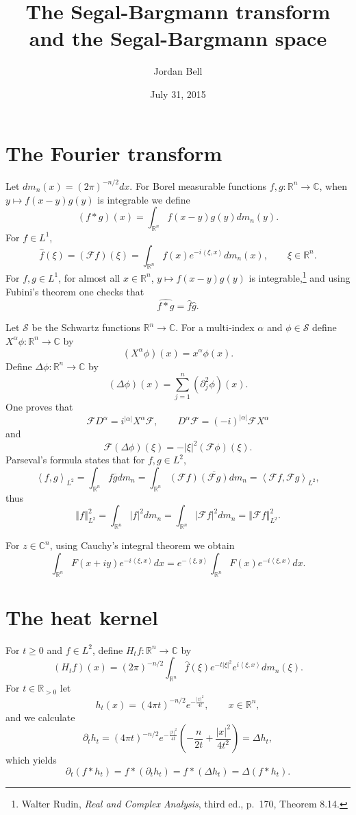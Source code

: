 \documentclass{article}
\newcommand{\inner}[2]{\left\langle #1, #2 \right\rangle}
\newcommand{\norm}[1]{\left\Vert #1 \right\Vert}
\theoremstyle{definition}
\begin{document}
\title{The Segal-Bargmann transform and the Segal-Bargmann space}
\author{Jordan Bell}
\date{July 31, 2015}

\maketitle

\section{The Fourier transform}
Let $dm_n(x) = (2\pi)^{-n/2} dx$. 
For Borel measurable functions $f,g:\mathbb{R}^n \to \mathbb{C}$, when $y \mapsto f(x-y) g(y)$ is integrable we define
\[
(f*g)(x) = \int_{\mathbb{R}^n} f(x-y) g(y) dm_n(y).
\]
For $f \in L^1$,
\[
\hat{f}(\xi) = (\mathscr{F}f)(\xi) = \int_{\mathbb{R}^n} f(x) e^{-i\inner{\xi}{x}} dm_n(x),
\qquad \xi \in \mathbb{R}^n.
\]
For $f,g \in L^1$, for almost all $x \in \mathbb{R}^n$, $y \mapsto f(x-y) g(y)$ is integrable,\footnote{Walter Rudin,
{\em Real and Complex Analysis}, third ed., p.~170, Theorem 8.14.}
and using Fubini's theorem one checks that
\[
\widehat{f*g}=\widehat{f} \widehat{g}.
\]

Let $\mathscr{S}$ be the Schwartz functions 
$\mathbb{R}^n \to \mathbb{C}$. 
For a multi-index $\alpha$ and $\phi \in \mathscr{S}$
define $X^\alpha \phi:\mathbb{R}^n \to \mathbb{C}$ by
\[
(X^\alpha \phi)(x) = x^\alpha \phi(x).
\]
Define $\Delta \phi:\mathbb{R}^n \to \mathbb{C}$ by
\[
(\Delta \phi)(x) = \sum_{j=1}^n (\partial_j^2 \phi)(x).
\]
One proves that 
\[
\mathscr{F} D^\alpha = i^{|\alpha|} X^\alpha \mathscr{F},
\qquad D^\alpha \mathscr{F} = (-i)^{|\alpha|} \mathscr{F} X^\alpha
\]
and
\[
\mathscr{F}(\Delta \phi)(\xi) = -|\xi|^2 (\mathscr{F}\phi)(\xi).
\]
Parseval's formula states that for $f,g \in L^2$,
\[
\inner{f}{g}_{L^2}=\int_{\mathbb{R}^n} f \overline{g} dm_n = \int_{\mathbb{R}^n} (\mathscr{F} f)\overline{(\mathscr{F}g)} dm_n=
\inner{\mathscr{F}f}{\mathscr{F}g}_{L^2},
\]
thus
\[
\norm{f}_{L^2}^2 = \int_{\mathbb{R}^n} |f|^2 dm_n
=\int_{\mathbb{R}^n} |\mathscr{F} f|^2 dm_n = \norm{\mathscr{F}f}_{L^2}^2.
\]


For $z \in \mathbb{C}^n$, using Cauchy's integral theorem we obtain
\begin{equation}
\int_{\mathbb{R}^n} F(x+iy) e^{-i\inner{\xi}{x}} dx=
e^{-\inner{\xi}{y}} \int_{\mathbb{R}^n} F(x) e^{-i\inner{\xi}{x}} dx.
\label{contours}
\end{equation}


\section{The heat kernel}
For $t \geq 0$ and $f \in L^2$, define $H_t f:\mathbb{R}^n \to \mathbb{C}$ by
\[
(H_t f)(x)  = (2\pi)^{-n/2} \int_{\mathbb{R}^n} \widehat{f}(\xi) e^{-t |\xi|^2} e^{i\inner{\xi}{x}} dm_n(\xi).
\]
For $t \in \mathbb{R}_{>0}$ let
\[
h_t(x) = (4\pi t)^{-n/2} e^{-\frac{|x|^2}{4t}},\qquad x \in \mathbb{R}^n,
\]
and we calculate
\[
\partial_t h_t = (4\pi t)^{-n/2} e^{-\frac{|x|^2}{4t}} \left( -\frac{n}{2t}+\frac{|x|^2}{4t^2}\right)
=\Delta h_t,
\]
which yields
\[
\partial_t ( f* h_t) = f*(\partial_t h_t) = f*(\Delta h_t)
=\Delta (f*h_t).
\]
\end{document}
